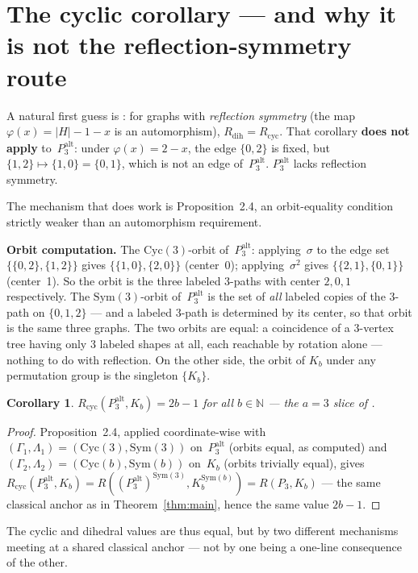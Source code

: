 \documentclass[11pt]{article}
\newtheorem{corollary}[theorem]{Corollary}
\theoremstyle{definition}
\newcommand{\Sym}{\mathrm{Sym}}
\newcommand{\Cyc}{\mathrm{Cyc}}
\newcommand{\Rdih}{R_{\mathrm{dih}}}
\newcommand{\Rcyc}{R_{\mathrm{cyc}}}
\newcommand{\Palt}{P_3^{\mathrm{alt}}}
\begin{document}
\section{The cyclic corollary --- and why it is not the
         reflection-symmetry route}

A natural first guess is \cite[Corollary~2.5]{DD26}: for graphs with
\emph{reflection symmetry} (the map $\varphi(x) = |H|-1-x$ is an automorphism),
$\Rdih = \Rcyc$. That corollary \textbf{does not apply} to~$\Palt$: under
$\varphi(x) = 2-x$, the edge $\{0,2\}$ is fixed, but
$\{1,2\} \mapsto \{1,0\} = \{0,1\}$, which is not an edge of~$\Palt$. $\Palt$
lacks reflection symmetry.

The mechanism that does work is Proposition~2.4, an orbit-equality condition
strictly weaker than an automorphism requirement.

\medskip\noindent\textbf{Orbit computation.}\quad
The $\Cyc(3)$-orbit of~$\Palt$: applying~$\sigma$ to the edge set
$\{\{0,2\},\{1,2\}\}$ gives $\{\{1,0\},\{2,0\}\}$ (center~0); applying~$\sigma^2$
gives $\{\{2,1\},\{0,1\}\}$ (center~1). So the orbit is the three labeled 3-paths
with center $2, 0, 1$ respectively. The $\Sym(3)$-orbit of~$\Palt$ is the set of
\emph{all} labeled copies of the 3-path on $\{0,1,2\}$ --- and a labeled 3-path
is determined by its center, so that orbit is the same three graphs. The two orbits
are equal: a coincidence of a 3-vertex tree having only 3 labeled shapes at all,
each reachable by rotation alone --- nothing to do with reflection. On the other
side, the orbit of $K_b$ under any permutation group is the singleton $\{K_b\}$.

\begin{corollary}\label{cor:cyclic}
$\Rcyc(\Palt, K_b) = 2b-1$ for all $b \in \mathbb{N}$ --- the $a=3$ slice of
\cite[Conjecture~4.23]{Bas26}.
\end{corollary}

\begin{proof}
Proposition~2.4, applied coordinate-wise with
$(\Gamma_1, \Lambda_1) = (\Cyc(3), \Sym(3))$ on~$\Palt$ (orbits equal, as
computed) and $(\Gamma_2, \Lambda_2) = (\Cyc(b), \Sym(b))$ on~$K_b$ (orbits
trivially equal), gives
$\Rcyc(\Palt, K_b) = R((\Palt)^{\Sym(3)}, K_b^{\Sym(b)}) = R(P_3, K_b)$ ---
the same classical anchor as in Theorem~\ref{thm:main}, hence the same value
$2b-1$.
\end{proof}

The cyclic and dihedral values are thus equal, but by two different mechanisms
meeting at a shared classical anchor --- not by one being a one-line consequence
of the other.
\end{document}
